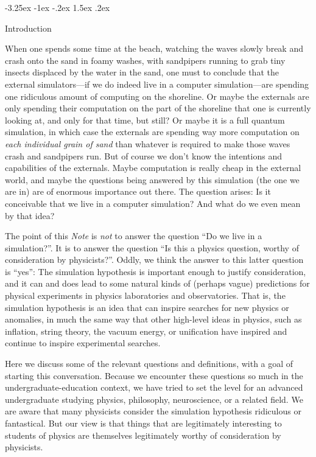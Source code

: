 \documentclass[12pt,letterpaper]{article}
\makeatletter
\renewcommand\section{\@startsection {section}{1}{\z@}%
  {-3.25ex \@plus -1ex \@minus -.2ex}%
  {1.5ex \@plus .2ex}%
  {\raggedright\normalfont\large\bfseries}}
\newcommand{\documentname}{\textsl{Note}}
\makeatother
\begin{document}
\section{Introduction}

When one spends some time at the beach, watching the waves slowly break and crash onto the sand in foamy washes, with sandpipers running to grab tiny insects displaced by the water in the sand, one must to conclude that the external simulators---if we do indeed live in a computer simulation---are spending one ridiculous amount of computing on the shoreline.
Or maybe the externals are only spending their computation on the part of the shoreline that one is currently looking at, and only for that time, but still?
Or maybe it is a full quantum simulation, in which case the externals are spending way more computation on \emph{each individual grain of sand} than whatever is required to make those waves crash and sandpipers run.
But of course we don't know the intentions and capabilities of the externals.
Maybe computation is really cheap in the external world, and maybe the questions being answered by this simulation (the one we are in) are of enormous importance out there.
The question arises: Is it conceivable that we live in a computer simulation?
And what do we even mean by that idea?

The point of this \documentname{} is \emph{not} to answer the question ``Do we live in a simulation?''.
It is to answer the question ``Is this a physics question, worthy of consideration by physicists?''.
Oddly, we think the answer to this latter question is ``yes'':
The simulation hypothesis is important enough to justify consideration, and it can and does lead to some natural kinds of (perhaps vague) predictions for physical experiments in physics laboratories and observatories.
That is, the simulation hypothesis is an idea that can inspire searches for new physics or anomalies, in much the same way that other high-level ideas in physics, such as inflation, string theory, the vacuum energy, or unification have inspired and continue to inspire experimental searches.

Here we discuss some of the relevant questions and definitions, with a goal of starting this conversation.
Because we encounter these questions so much in the undergraduate-education context, we have tried to set the level for an advanced undergraduate studying physics, philosophy, neuroscience, or a related field.
We are aware that many physicists consider the simulation hypothesis ridiculous or fantastical.
But our view is that things that are legitimately interesting to students of physics are themselves legitimately worthy of consideration by physicists.
\end{document}
